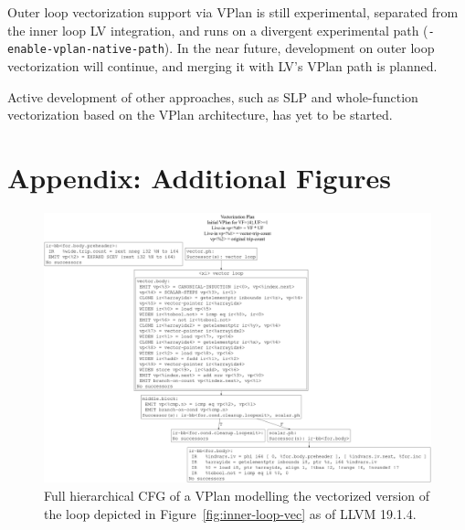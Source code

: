 \documentclass[sigplan,11pt,nonacm]{acmart}
\begin{document}
Outer loop vectorization support via VPlan is still experimental, separated from the inner loop
LV integration, and runs on a divergent experimental path (\texttt{-enable-\allowbreak vplan-\allowbreak native-\allowbreak path}).
In the near future, development on outer loop vectorization will continue, and merging 
it with LV's VPlan path is planned.

Active development of other approaches, such as SLP and whole-function vectorization based on the VPlan 
architecture, has yet to be started.




\appendix

\section{Appendix: Additional Figures}\label{appendix-figures}

\begin{figure}
  \centering
  \includegraphics[width=\textwidth]{images/inner-loop-vplan-hcfg.png}
  \caption{Full hierarchical CFG of a VPlan modelling the vectorized version of the loop 
  depicted in Figure~\ref{fig:inner-loop-vec} as of LLVM 19.1.4.}
  \label{fig:inner-loop-vplan-hcfg}
\end{figure}
\end{document}
